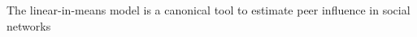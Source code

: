 \documentclass[final]{beamer}
\newlength{\colwidth}
\begin{document}
\begin{frame}[t]
\begin{columns}[t]
\begin{column}{\colwidth}
\begin{block}{The linear-in-means model is a canonical tool to estimate peer influence in social networks}





\end{block}
\end{column}
\end{columns}
\end{frame}
\end{document}
